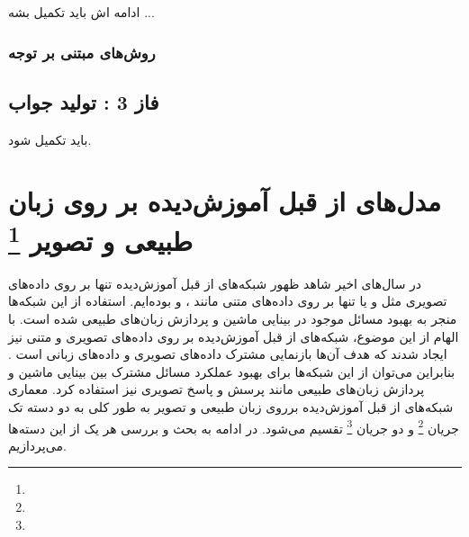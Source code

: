   ادامه اش باید تکمیل بشه ... 
\subsubsection{ روش‌های مبتنی بر توجه}


\subsection{فاز 3 : تولید جواب}
باید تکمیل شود.

\section[مدل‌های از قبل آموزش‌دیده بر روی  زبان طبیعی و تصویر]{مدل‌های از قبل آموزش‌دیده بر روی  زبان طبیعی و تصویر \protect\footnote{}}
	در سال‌های اخیر شاهد ظهور شبکه‌های از قبل آموزش‌دیده تنها بر روی داده‌های تصویری مثل 
	\cite{he2016deep}
	و یا تنها بر روی داده‌های متنی مانند
	\cite{devlin2018bert}
	،
	\cite{radford2019language}
	و 
	\cite{brown2020language}
	بوده‌ایم. استفاده از این شبکه‌ها منجر به بهبود مسائل موجود در بینایی ماشین و پردازش زبان‌های طبیعی شده است. با الهام از این موضوع، شبکه‌های از قبل آموزش‌دیده بر روی داده‌های تصویری و متنی نیز ایجاد شدند که هدف آن‌ها بازنمایی مشترک داده‌های تصویری و داده‌های زبانی است . بنابراین می‌توان از این شبکه‌ها برای بهبود عملکرد مسائل مشترک بین بینایی ماشین و پردازش زبان‌های طبیعی مانند پرسش و پاسخ تصویری نیز استفاده کرد. معماری شبکه‌های از قبل آموزش‌دیده برروی زبان طبیعی و تصویر به طور کلی به دو دسته تک جریان
	\footnote{}
	و دو جریان
	\footnote{}
	تقسیم می‌شود. در ادامه به بحث و بررسی هر یک از این دسته‌ها می‌پردازیم.

